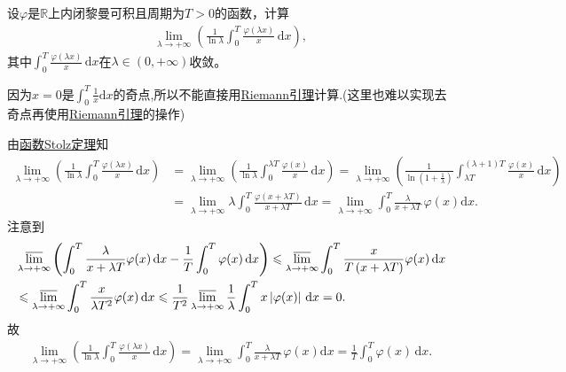\documentclass[../../main.tex]{subfiles}
\begin{document}
\begin{example}
设\(\varphi\)是\(\mathbb{R}\)上内闭黎曼可积且周期为\(T > 0\)的函数，计算
\begin{align*}
\lim_{\lambda \to +\infty} \left( \frac{1}{\ln \lambda} \int_0^T \frac{\varphi(\lambda x)}{x} \, \mathrm{d}x \right),
\end{align*}
其中\(\int_0^T \frac{\varphi(\lambda x)}{x} \, \mathrm{d}x\)在\(\lambda \in (0, +\infty)\)收敛。
\end{example}
\begin{remark}
因为$x=0$是$\int_0^T{\frac{1}{x}\mathrm{d}x}$的奇点,所以不能直接用\hyperref[theorem:Riemann引理]{Riemann引理}计算.(这里也难以实现去奇点再使用\hyperref[theorem:Riemann引理]{Riemann引理}的操作)
\end{remark}
\begin{solution}
由\hyperref[theorem:函数Stolz定理]{函数Stolz定理}知
\begin{align*}
\lim_{\lambda \rightarrow +\infty} \left( \frac{1}{\ln \lambda}\int_0^T{\frac{\varphi (\lambda x)}{x}\,\mathrm{d}x} \right) &=\lim_{\lambda \rightarrow +\infty} \left( \frac{1}{\ln \lambda}\int_0^{\lambda T}{\frac{\varphi (x)}{x}\,\mathrm{d}x} \right) =\lim_{\lambda \rightarrow +\infty} \left( \frac{1}{\ln \left( 1+\frac{1}{\lambda} \right)}\int_{\lambda T}^{\left( \lambda +1 \right) T}{\frac{\varphi (x)}{x}\,\mathrm{d}x} \right) \\
&=\lim_{\lambda \rightarrow +\infty} \lambda \int_0^T{\frac{\varphi (x+\lambda T)}{x+\lambda T}\,\mathrm{d}x} =\lim_{\lambda \rightarrow +\infty} \int_0^T{\frac{\lambda}{x+\lambda T}\,\varphi (x)\mathrm{d}x}.
\end{align*}
注意到
\begin{align*}
&\varlimsup_{\lambda \rightarrow +\infty}\left( \int_0^T{\frac{\lambda}{x+\lambda T}\varphi (x)\,\mathrm{d}x}-\frac{1}{T}\int_0^T{\varphi (x)\,\mathrm{d}x} \right) \leqslant \varlimsup_{\lambda \rightarrow +\infty}\int_0^T{\frac{x}{T\left( x+\lambda T \right)}\varphi (x)\,\mathrm{d}x} \\
&\leqslant \varlimsup_{\lambda \rightarrow +\infty}\int_0^T{\frac{x}{\lambda T^2}\varphi (x)\,\mathrm{d}x} \leqslant \frac{1}{T^2}\varlimsup_{\lambda \rightarrow +\infty}\frac{1}{\lambda}\int_0^T{x\left| \varphi (x) \right|\,\mathrm{d}x}=0.
\end{align*}
故
\begin{align*}
\lim_{\lambda \rightarrow +\infty} \left( \frac{1}{\ln \lambda}\int_0^T{\frac{\varphi (\lambda x)}{x}\,\mathrm{d}x} \right) =\lim_{\lambda \rightarrow +\infty} \int_0^T{\frac{\lambda}{x+\lambda T}\,\varphi (x)\mathrm{d}x}=\frac{1}{T}\int_0^T{\varphi (x)\,\mathrm{d}x}.
\end{align*}
\end{solution}
\end{document}
